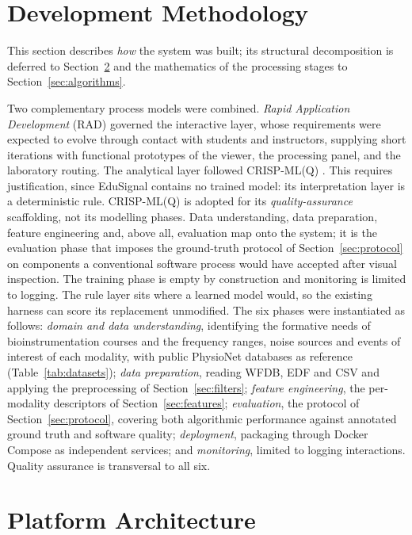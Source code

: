 \documentclass[conference]{IEEEtran}
\begin{document}
\section{Development Methodology}
\label{sec:methodology}

This section describes \emph{how} the system was built; its structural decomposition is deferred to Section~\ref{sec:architecture} and the mathematics of the processing stages to Section~\ref{sec:algorithms}.

Two complementary process models were combined. \textit{Rapid Application Development} (RAD) \cite{yen2019rapid} governed the interactive layer, whose requirements were expected to evolve through contact with students and instructors, supplying short iterations with functional prototypes of the viewer, the processing panel, and the laboratory routing. The analytical layer followed CRISP-ML(Q) \cite{make3020020}. This requires justification, since EduSignal contains no trained model: its interpretation layer is a deterministic rule. CRISP-ML(Q) is adopted for its \emph{quality-assurance} scaffolding, not its modelling phases. Data understanding, data preparation, feature engineering and, above all, evaluation map onto the system; it is the evaluation phase that imposes the ground-truth protocol of Section~\ref{sec:protocol} on components a conventional software process would have accepted after visual inspection. The training phase is empty by construction and monitoring is limited to logging. The rule layer sits where a learned model would, so the existing harness can score its replacement unmodified. The six phases were instantiated as follows: \emph{domain and data understanding}, identifying the formative needs of bioinstrumentation courses and the frequency ranges, noise sources and events of interest of each modality, with public PhysioNet databases as reference (Table~\ref{tab:datasets}); \emph{data preparation}, reading WFDB, EDF and CSV and applying the preprocessing of Section~\ref{sec:filters}; \emph{feature engineering}, the per-modality descriptors of Section~\ref{sec:features}; \emph{evaluation}, the protocol of Section~\ref{sec:protocol}, covering both algorithmic performance against annotated ground truth and software quality; \emph{deployment}, packaging through Docker Compose as independent services; and \emph{monitoring}, limited to logging interactions. Quality assurance is transversal to all six.

\section{Platform Architecture}
\label{sec:architecture}
\end{document}

